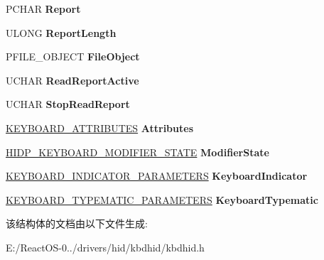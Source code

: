 \begin{DoxyCompactItemize}
P\+C\+H\+AR {\bfseries Report}
\item 
\mbox{\label{struct_k_b_d_h_i_d___d_e_v_i_c_e___e_x_t_e_n_s_i_o_n_a93c80f2c977e876e648a133391ba3fe5}} 
U\+L\+O\+NG {\bfseries Report\+Length}
\item 
\mbox{\label{struct_k_b_d_h_i_d___d_e_v_i_c_e___e_x_t_e_n_s_i_o_n_abe118e7ed0c2f2ab1a18f9795a72931c}} 
P\+F\+I\+L\+E\+\_\+\+O\+B\+J\+E\+CT {\bfseries File\+Object}
\item 
\mbox{\label{struct_k_b_d_h_i_d___d_e_v_i_c_e___e_x_t_e_n_s_i_o_n_af2f87805240b6bc15ccc74c438531254}} 
U\+C\+H\+AR {\bfseries Read\+Report\+Active}
\item 
\mbox{\label{struct_k_b_d_h_i_d___d_e_v_i_c_e___e_x_t_e_n_s_i_o_n_a91b76d2c7cf6e86b340aab17eb70edb5}} 
U\+C\+H\+AR {\bfseries Stop\+Read\+Report}
\item 
\mbox{\label{struct_k_b_d_h_i_d___d_e_v_i_c_e___e_x_t_e_n_s_i_o_n_af9b0ab20ceb1180e9d5d695018854b1a}} 
\hyperlink{struct___k_e_y_b_o_a_r_d___a_t_t_r_i_b_u_t_e_s}{K\+E\+Y\+B\+O\+A\+R\+D\+\_\+\+A\+T\+T\+R\+I\+B\+U\+T\+ES} {\bfseries Attributes}
\item 
\mbox{\label{struct_k_b_d_h_i_d___d_e_v_i_c_e___e_x_t_e_n_s_i_o_n_ae785b4c5dc3a3fb095aa579886b23621}} 
\hyperlink{struct___h_i_d_p___k_e_y_b_o_a_r_d___m_o_d_i_f_i_e_r___s_t_a_t_e}{H\+I\+D\+P\+\_\+\+K\+E\+Y\+B\+O\+A\+R\+D\+\_\+\+M\+O\+D\+I\+F\+I\+E\+R\+\_\+\+S\+T\+A\+TE} {\bfseries Modifier\+State}
\item 
\mbox{\label{struct_k_b_d_h_i_d___d_e_v_i_c_e___e_x_t_e_n_s_i_o_n_acc6f8d1abcf966e11f9cef1170a71897}} 
\hyperlink{struct___k_e_y_b_o_a_r_d___i_n_d_i_c_a_t_o_r___p_a_r_a_m_e_t_e_r_s}{K\+E\+Y\+B\+O\+A\+R\+D\+\_\+\+I\+N\+D\+I\+C\+A\+T\+O\+R\+\_\+\+P\+A\+R\+A\+M\+E\+T\+E\+RS} {\bfseries Keyboard\+Indicator}
\item 
\mbox{\label{struct_k_b_d_h_i_d___d_e_v_i_c_e___e_x_t_e_n_s_i_o_n_a58abcb44384fd256a4e868dc44b258da}} 
\hyperlink{struct___k_e_y_b_o_a_r_d___t_y_p_e_m_a_t_i_c___p_a_r_a_m_e_t_e_r_s}{K\+E\+Y\+B\+O\+A\+R\+D\+\_\+\+T\+Y\+P\+E\+M\+A\+T\+I\+C\+\_\+\+P\+A\+R\+A\+M\+E\+T\+E\+RS} {\bfseries Keyboard\+Typematic}
\end{DoxyCompactItemize}


该结构体的文档由以下文件生成\+:\begin{DoxyCompactItemize}
\item 
E\+:/\+React\+O\+S-\/0../drivers/hid/kbdhid/kbdhid.\+h\end{DoxyCompactItemize}
